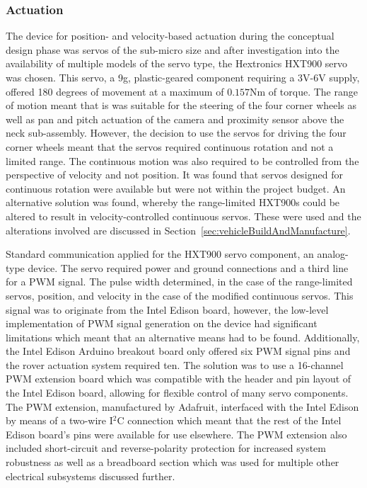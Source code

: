     \subsubsection{Actuation}
      The device for position- and velocity-based actuation during the conceptual design phase was servos of the sub-micro size and after investigation into the availability of multiple models of the servo type, the Hextronics HXT900 servo was chosen. This servo, a 9g, plastic-geared component requiring a 3V-6V supply, offered 180 degrees of movement at a maximum of $0.157$Nm of torque. The range of motion meant that is was suitable for the steering of the four corner wheels as well as pan and pitch actuation of the camera and proximity sensor above the neck sub-assembly. However, the decision to use the servos for driving the four corner wheels meant that the servos required continuous rotation and not a limited range. The continuous motion was also required to be controlled from the perspective of velocity and not position. It was found that servos designed for continuous rotation were available but were not within the project budget. An alternative solution was found, whereby the range-limited HXT900s could be altered to result in velocity-controlled continuous servos. These were used and the alterations involved are discussed in Section~\ref{sec:vehicleBuildAndManufacture}.
      
      Standard communication applied for the HXT900 servo component, an analog-type device. The servo required power and ground connections and a third line for a PWM signal. The pulse width determined, in the case of the range-limited servos, position, and velocity in the case of the modified continuous servos. This signal was to originate from the Intel Edison board, however, the low-level implementation of PWM signal generation on the device had significant limitations which meant that an alternative means had to be found. Additionally, the Intel Edison Arduino breakout board only offered six PWM signal pins and the rover actuation system required ten. The solution was to use a 16-channel PWM extension board which was compatible with the header and pin layout of the Intel Edison board, allowing for flexible control of many servo components. The PWM extension, manufactured by Adafruit, interfaced with the Intel Edison by means of a two-wire I$^2$C connection which meant that the rest of the Intel Edison board's pins were available for use elsewhere. The PWM extension also included short-circuit and reverse-polarity protection for increased system robustness as well as a breadboard section which was used for multiple other electrical subsystems discussed further.
      
